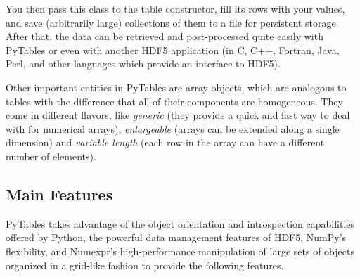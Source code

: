 You then pass this class to the table constructor, fill its rows
with your values, and save (arbitrarily large) collections of them to a
file for persistent storage. After that, the data can be retrieved and
post-processed quite easily with PyTables or even with another HDF5
application (in C, C++, Fortran, Java, Perl, and other languages which provide 
an interface to HDF5).

Other important entities in PyTables are
array objects, which are analogous to tables with
the difference that all of their components are homogeneous. They come
in different flavors, like \emph{generic} (they provide a
quick and fast way to deal with for numerical arrays),
\emph{enlargeable} (arrays can be extended along a single
dimension) and \emph{variable length} (each row in the
array can have a different number of elements).




\subsection{Main Features}

PyTables takes advantage of the object orientation and
introspection capabilities offered by Python, the powerful data
management features of HDF5, NumPy's flexibility, and Numexpr's
high-performance manipulation of large sets of objects organized in a
grid-like fashion to provide the following features.

